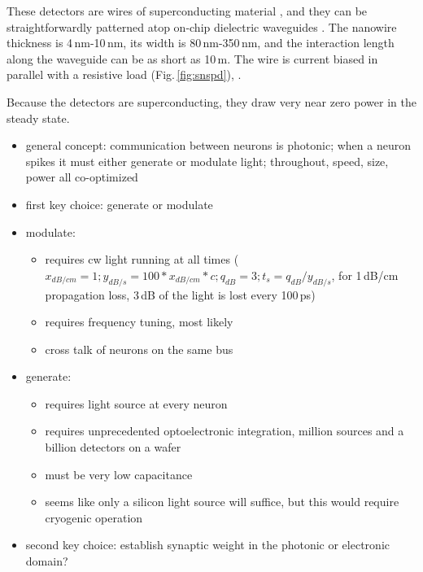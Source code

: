 \documentclass[twocolumn]{article}
\begin{document}
These detectors are wires of superconducting material \cite{mave2013}, and they can be straightforwardly patterned atop on-chip dielectric waveguides \cite{shbu2017b,x,y,z}. The nanowire thickness is 4\,nm-10\,nm, its width is 80\,nm-350\,nm, and the interaction length along the waveguide can be as short as 10\,\textmu m. The wire is current biased in parallel with a resistive load (Fig.\,\ref{fig:snspd}), .

Because the detectors are superconducting, they draw very near zero power in the steady state. 



\begin{itemize}

\item general concept: communication between neurons is photonic; when a neuron spikes it must either generate or modulate light; throughout, speed, size, power all co-optimized

\item first key choice: generate or modulate

\item modulate:
\begin{itemize}
\item requires cw light running at all times ($x_{dB/cm} = 1; y_{dB/s} = 100*x_{dB/cm}*c; q_{dB} = 3; t_s = q_{dB}/y_{dB/s}$, for 1\,dB/cm propagation loss, 3\,dB of the light is lost every 100\,ps)
\item requires frequency tuning, most likely
\item cross talk of neurons on the same bus
\end{itemize}

\item generate:
\begin{itemize}
\item requires light source at every neuron
\item requires unprecedented optoelectronic integration, million sources and a billion detectors on a wafer
\item must be very low capacitance
\item seems like only a silicon light source will suffice, but this would require cryogenic operation
\end{itemize}

\item second key choice: establish synaptic weight in the photonic or electronic domain?


\end{itemize}
\end{document}
